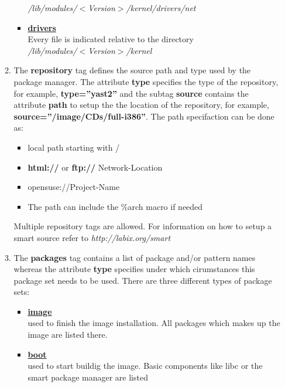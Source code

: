 \begin{itemize}
\begin{enumerate}
\begin{itemize}
                      \textit{/lib/modules/$<$Version$>$/kernel/drivers/net}
                \item \textbf{\underline{drivers}}\\
                      Every file is indicated relative to the directory\\
                      \textit{/lib/modules/$<$Version$>$/kernel}
                \end{itemize}
          \item The \textbf{repository} tag defines the source path and
                type used by the package manager. The attribute
                \textbf{type} specifies the
                type of the repository, for example,
                \textbf{type=''yast2''} and the subtag \textbf{source}
                contains the attribute \textbf{path} to setup the
                the location of the repository, for example,
                \textbf{source=''/image/CDs/full-i386''}. The path
                specifaction can be done as:
                \begin{itemize}
                \item local path starting with /
                \item \textbf{html://} or \textbf{ftp://} Network-Location
                \item opensuse://Project-Name
                \item The path can include the \%arch macro if needed
                \end{itemize}
                Multiple repository
                tags are allowed. For information on how to setup a smart
                source refer to \textit{http://labix.org/smart}
		  \item The \textbf{packages} tag contains a list of package and/or
				pattern names whereas the attribute \textbf{type} specifies
				under which cirumstances this package set needs to be used.
				There are three different types of package sets:
                \begin{itemize}
                \item \textbf{\underline{image}}\\
                      used to finish the image installation. All packages
                      which makes up the image are listed there.
                \item \textbf{\underline{boot}}\\
                      used to start buildig the image. Basic components
                      like libc or the smart package manager are listed

\end{itemize}
\end{enumerate}
\end{itemize}
